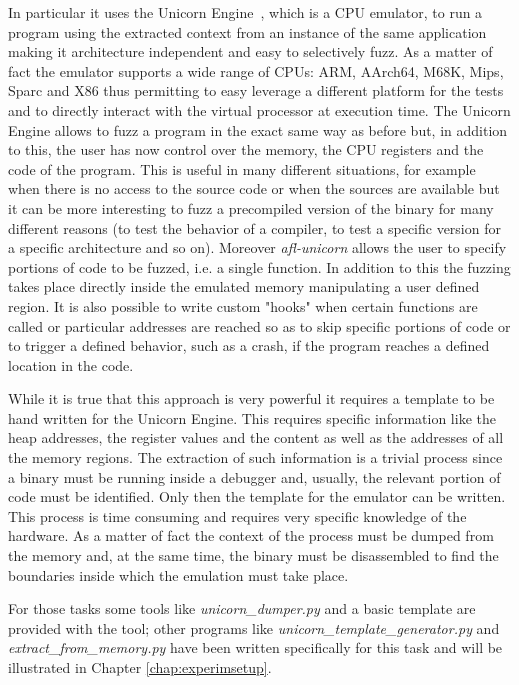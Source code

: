 \documentclass[../main.tex]{subfiles}
\begin{document}
In particular it uses the Unicorn Engine~\cite{unicorn}, which is a CPU emulator, to run a program using the extracted context from an instance of the same application making it architecture independent and easy to selectively fuzz. As a matter of fact the emulator supports a wide range of CPUs: ARM, AArch64, M68K, Mips, Sparc and X86 thus permitting to easy leverage a different platform for the tests and to directly interact with the virtual processor at execution time. The Unicorn Engine allows to fuzz a program in the exact same way as before but, in addition to this, the user has now control over the memory, the CPU registers and the code of the program. This is useful in many different situations, for example when there is no access to the source code or when the sources are available but it can be more interesting to fuzz a precompiled version of the binary for many different reasons (to test the behavior of a compiler, to test a specific version for a specific architecture and so on). Moreover \textit{afl-unicorn} allows the user to specify portions of code to be fuzzed, i.e. a single function. In addition to this the fuzzing takes place directly inside the emulated memory manipulating a user defined region. It is also possible to write custom "hooks" when certain functions are called or particular addresses are reached so as to skip specific portions of code or to trigger a defined behavior, such as a crash, if the program reaches a defined location in the code.

While it is true that this approach is very powerful it requires a template  to be hand written for the Unicorn Engine. This requires specific information like the heap addresses, the register values and the content as well as the addresses of all the memory regions. The extraction of such information is a trivial process since a binary must be running inside a debugger and, usually, the relevant portion of code must be identified. Only then the template for the emulator can be written. This process is time consuming and requires very specific knowledge of the hardware. As a matter of fact the context of the process must be dumped from the memory and, at the same time, the binary must be disassembled to find the boundaries inside which the emulation must take place.

For those tasks some tools like \textit{unicorn\_dumper.py} and a basic template are provided with the tool; other programs like \textit{unicorn\_template\_generator.py} and \textit{extract\_from\_memory.py} have been written specifically for this task and will be illustrated in Chapter \ref{chap:experimsetup}.
\end{document}
